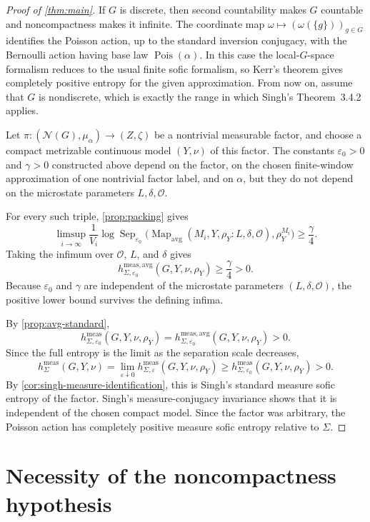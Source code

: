 \documentclass[12pt]{amsart}
\theoremstyle{definition}
\newcommand{\Mapavg}{\operatorname{Map}_{\mathrm{avg}}}
\newcommand{\Sep}{\operatorname{Sep}}
\newcommand{\cN}{\mathcal N}
\newcommand{\cO}{\mathcal O}
\newcommand{\1}{\mathbf 1}
\newcommand{\eps}{\varepsilon}
\begin{document}
\begin{proof}[Proof of \cref{thm:main}]
	If $G$ is discrete, then second countability makes $G$ countable and
noncompactness makes it infinite. The coordinate map
$\omega\mapsto(\omega(\{g\}))_{g\in G}$ identifies the Poisson action,
up to the standard inversion conjugacy, with the Bernoulli action having
base law $\operatorname{Pois}(\alpha)$. In this case the local-$G$-space
formalism reduces to the usual finite sofic formalism, so Kerr's theorem
\cite{KerrCPE} gives completely positive entropy for the given
approximation. From now on, assume that $G$ is nondiscrete, which is exactly the
range in which Singh's Theorem~3.4.2 applies.	
	
Let $\pi:(\cN(G),\mu_\alpha)\to(Z,\zeta)$ be a nontrivial measurable factor, and choose a compact metrizable continuous model $(Y,\nu)$ of this factor. The constants $\eps_0>0$ and $\gamma>0$ constructed above depend on the factor, on the chosen finite-window approximation of one nontrivial factor label, and on $\alpha$, but they do not depend on the microstate parameters $L,\delta,\cO$.

For every such triple, \cref{prop:packing} gives
\[
 \limsup_{i\to\infty}\frac1{V_i}
 \log\Sep_{\eps_0}
 \bigl(\Mapavg(M_i,Y,\rho_Y:L,\delta,\cO),\rho_Y^{M_i}\bigr)
 \geq\frac\gamma4.
\]
Taking the infimum over $\cO$, $L$, and $\delta$ gives
\[
 h^{\mathrm{meas,avg}}_{\Sigma,\eps_0}(G,Y,\nu,\rho_Y)
 \geq\frac\gamma4>0.
\]
Because $\eps_0$ and $\gamma$ are independent of the microstate parameters $(L,\delta,\cO)$, the positive lower bound survives the defining infima.

By \cref{prop:avg-standard},
\[
 h^{\mathrm{meas}}_{\Sigma,\eps_0}(G,Y,\nu,\rho_Y)
 =h^{\mathrm{meas,avg}}_{\Sigma,\eps_0}(G,Y,\nu,\rho_Y)>0.
\]
Since the full entropy is the limit as the separation scale decreases,
\[
 h^{\mathrm{meas}}_\Sigma(G,Y,\nu)
 =\lim_{\eps\downarrow0}h^{\mathrm{meas}}_{\Sigma,\eps}(G,Y,\nu,\rho_Y)
 \geq h^{\mathrm{meas}}_{\Sigma,\eps_0}(G,Y,\nu,\rho_Y)>0.
\]
	By \cref{cor:singh-measure-identification}, this is
Singh's standard measure sofic entropy of the factor.  Singh's
measure-conjugacy invariance shows that it is independent of the chosen
compact model. Since the factor was arbitrary, the Poisson action has
completely positive measure sofic entropy relative to $\Sigma$.
\end{proof}

\section{Necessity of the noncompactness hypothesis}
\end{document}
